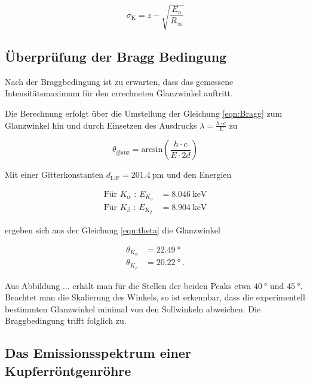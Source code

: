   \begin{equation}
    \sigma_\text{K} = z - \sqrt{\frac{E_n}{R_{\infty}}}
  \end{equation}








\subsection{Überprüfung der Bragg Bedingung}

Nach der Braggbedingung ist zu erwarten, dass das gemessene Intensitätsmaximum
für den errechneten Glanzwinkel auftritt. 

Die Berechnung erfolgt über die Umstellung der Gleichung \eqref{eqn:Bragg} zum Glanzwinkel
hin und durch Einsetzen des Ausdrucks $\lambda = \frac{h \cdot c}{E}$ zu 

\begin{equation}
  \theta_\text{glanz} = \text{arcsin}\left(\frac{h \cdot c}{E \cdot 2d}\right)
  \label{eqn:theta}
\end{equation}

Mit einer Gitterkonstanten $d_\text{LiF} = \SI{201.4}{\pico\meter}$ und den Energien

\begin{align*}
   \text{Für } K_\alpha \text{ : } E_{K_\alpha} &= \SI{8.046}{\kilo\eV} \\
   \text{Für } K_\beta \text{ : } E_{K_\beta} &= \SI{8.904}{\kilo\eV}
\end{align*}

ergeben sich aus der Gleichung \eqref{eqn:theta} die Glanzwinkel

\begin{align*}
  \theta_{K_\alpha} &= \SI{22.49}{\degree} \\
  \theta_{K_\beta} &= \SI{20.22}{\degree} \: .
\end{align*}

Aus Abbildung ... erhält man für die Stellen der beiden Peaks etwa $\SI{40}{\degree}$
und $\SI{45}{\degree}$. Beachtet man die Skalierung des Winkels, so ist
erkennbar, dass die experimentell bestimmten Glanzwinkel minimal von den Sollwinkeln
abweichen. Die Braggbedingung trifft folglich zu.

\subsection{Das Emissionsspektrum einer Kupferröntgenröhre}








